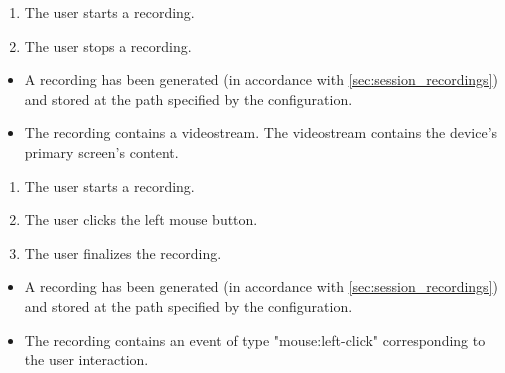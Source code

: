 \begin{tests}
    {\begin{enumerate}
        \item The \gls{user} starts a recording.
        \item The \gls{user} stops a recording.
    \end{enumerate}}
    {\begin{itemize}
        \item A recording has been generated (in accordance with \ref{sec:session_recordings}) and stored at the path specified by the configuration.
        \item The recording contains a \gls{videostream}. The \gls{videostream} contains the \gls{device}'s primary screen's content.
    \end{itemize}}

    {\begin{enumerate}
        \item The \gls{user} starts a recording.
        \item The \gls{user} clicks the left mouse button.
        \item The \gls{user} finalizes the recording.
    \end{enumerate}}
    {\begin{itemize}
        \item A recording has been generated (in accordance with \ref{sec:session_recordings}) and stored at the path specified by the configuration.
        \item The recording contains an \gls{event} of type "mouse:left-click" corresponding to the \gls{user} interaction.
    \end{itemize}}


\end{tests}
